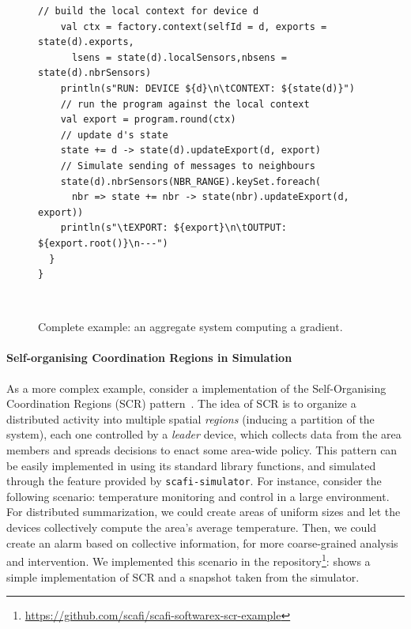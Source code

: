 \begin{figure}
\begin{lrbox}{\exosystem}
\begin{lstlisting}[deletekeywords={[2]{nbr}},
emph={state}, basicstyle=\lst@ifdisplaystyle\footnotesize\fi\ttfamily]
    // build the local context for device d
    val ctx = factory.context(selfId = d, exports = state(d).exports,
      lsens = state(d).localSensors,nbsens = state(d).nbrSensors)
    println(s"RUN: DEVICE ${d}\n\tCONTEXT: ${state(d)}")
    // run the program against the local context
    val export = program.round(ctx)
    // update d's state
    state += d -> state(d).updateExport(d, export)
    // Simulate sending of messages to neighbours
    state(d).nbrSensors(NBR_RANGE).keySet.foreach(
      nbr => state += nbr -> state(nbr).updateExport(d, export))
    println(s"\tEXPORT: ${export}\n\tOUTPUT: ${export.root()}\n---")
  }
}
\end{lstlisting}
\end{lrbox}
\\
\caption{Complete example: an aggregate system computing a gradient.}
\label{fig:example-full}
\end{figure}

\paragraph{Self-organising Coordination Regions in Simulation}
%
As a more complex example,
 consider a \scafi{} implementation of the
 Self-Organising Coordination Regions (SCR) pattern~\cite{DBLP:journals/fgcs/PianiniCVN21}.
%
The idea of SCR is to organize a distributed activity
 into multiple spatial \emph{regions} (inducing a partition of the system),
 each one controlled by a \emph{leader} device,
 which collects data from the area members
 and spreads decisions to enact some area-wide policy.
%
This pattern can be easily implemented in \scafi{} 
 using its standard library functions,
 and simulated through the feature provided by \texttt{scafi-simulator}. 
%
For instance, consider the following scenario: 
 temperature monitoring and control in a large environment. 
%
For distributed summarization, 
 we could create areas of uniform sizes 
 and let 
 the devices collectively compute the area's average temperature. 
%
Then, we could create an alarm based on collective information, 
 for more coarse-grained analysis and intervention. %
%
We implemented this scenario in the repository\footnote{\url{https://github.com/scafi/scafi-softwarex-scr-example}}: 
  shows a simple \scafi{} implementation of SCR 
 and a snapshot taken from %
 the \scafi{} simulator.

